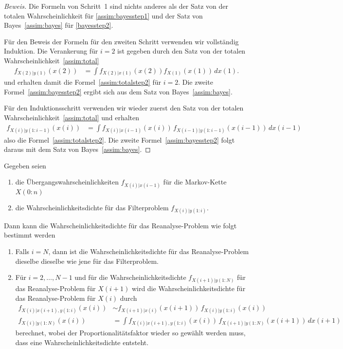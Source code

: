 \begin{proof}[Beweis]
Die Formeln von Schritt~1 sind nichts anderes als der Satz von
der totalen Wahrscheinlichkeit für \eqref{assim:bayesstep1} und
der Satz von Bayes~\eqref{assim:bayes} für \eqref{bayesstep2}.

Für den Beweis der Formeln für den zweiten Schritt verwenden wir 
vollständig Induktion.
Die Verankerung für $i=2$ ist gegeben durch den Satz von der totalen
Wahrscheinlichkeit~\eqref{assim:total}
\begin{align*}
f_{X(2)|y(1)}(x(2))
&=
\int f_{X(2)|x(1)}(x(2))  f_{X(1)}(x(1))\, dx(1).
\end{align*}
und erhalten damit die Formel~\eqref{assim:totalstep2} für $i=2$.
Die zweite Formel~\eqref{assim:bayesstep2} ergibt sich aus dem Satz
von Bayes~\eqref{assim:bayes}.

Für den Induktionsschritt verwenden wir wieder zuerst den Satz von der
totalen Wahrscheinlichkeit~\eqref{assim:total} und erhalten
\begin{align*}
f_{X(i)|y(1:i-1)}(x(i))
&=
\int f_{X(i)|x(i-1)}(x(i)) \, f_{X(i-1)|y(1:i-1)}(x(i-1))\,dx(i-1)
\end{align*}
also die Formel~\eqref{assim:totalstep2}.
Die zweite Formel~\eqref{assim:bayesstep2} folgt daraus mit dem Satz
von Bayes~\eqref{assim:bayes}.
\end{proof}


\begin{satz}[Reanalyse]
\label{satz:reanalyse}
Gegeben seien
\begin{enumerate}
\item
die Übergangswahrscheinlichkeiten $f_{X(i)|x(i-1)}$ für die
Markov-Kette $X(0:n)$
\item
die Wahrscheinlichkeitsdichte für das Filterproblem
$f_{X(i)|y(1:i)}$.
\end{enumerate}
Dann kann die Wahrscheinlichkeitsdichte für das Reanalyse-Problem wie folgt
bestimmt werden
\begin{enumerate}
\item Falls $i=N$, dann ist die Wahrscheinlichkeitsdichte für das
Reanalyse-Problem dieselbe dieselbe wie jene für das Filterproblem.
\item Für $i=2,\dots,N-1$ und für die Wahrscheinlichkeitsdichte 
$f_{X(i+1)|y(1:N)}$  für das Reanalyse-Problem für $X(i+1)$ 
wird die Wahrscheinlichkeitsdichte für das Reanalyse-Problem für $X(i)$
durch
\begin{align}
f_{X(i)|x(i+1),y(1:i)}(x(i))
&\sim
f_{X(i+1)|x(i)}(x(i+1))\, f_{X(i)|y(1:i)}(x(i))
\label{assim:reanabayes}
\\
f_{X(i)|y(1:N)}(x(i))
&=
\int f_{X(i)|x(i+1),y(1:i)}(x(i))\, f_{X(i+1)|y(1:N)}(x(i+1))\,dx(i+1)
\label{assim:reanatotal}
\end{align}
berechnet,
wobei der Proportionalitätsfaktor wieder so gewählt werden muss, dass
eine Wahrscheinlichkeitsdichte entsteht.
\end{enumerate}
\end{satz}


